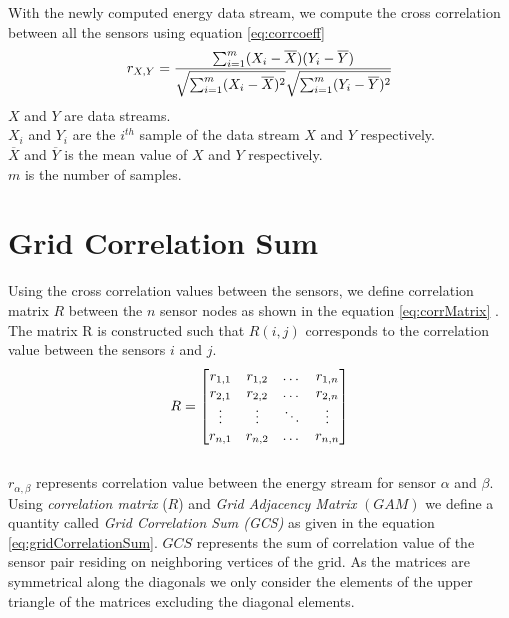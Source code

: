 With the newly computed energy data stream, we compute the cross correlation between all the sensors using equation \ref{eq:corrcoeff}
\begin{equation}
\label{eq:corrcoeff}
r_{X,Y}=\frac{\sum_{i=1}^{m}(X_i-\overline{X})(Y_i-\overline{Y})}{\sqrt{\sum_{i=1}^{m}(X_i-\overline{X})^2}\sqrt{\sum_{i=1}^{m}(Y_i-\overline{Y})^2}} \\
\end{equation}
$X$ and $Y$ are data streams.\\
$X_i$ and $Y_i$ are the $i^{th}$ sample of the data stream $X$ and $Y$ respectively.\\
$\overline{X}$ and $\overline{Y}$ is the mean value of $X$ and $Y$ respectively.\\
$m$ is the number of samples.\\

\section{Grid Correlation Sum}
\label{sec:gcs}
Using the cross correlation values between the sensors, we define correlation matrix $R$ between the $n$ sensor nodes as shown in the equation \ref{eq:corrMatrix} . The matrix R is constructed such that $R(i,j)$ corresponds to the correlation value between the sensors $i$ and $j$.
\begin{equation}
\label{eq:corrMatrix}
\centering
R = 
\begin{bmatrix}
    r_{1,1} & r_{1,2} & \dots  & r_{1,n} \\
    r_{2,1} & r_{2,2}  & \dots  & r_{2,n} \\
    \vdots & \vdots  & \ddots & \vdots \\
    r_{n,1} & r_{n,2}  & \dots  & r_{n,n}
\end{bmatrix}
\end{equation}\\
$r_{\alpha,\beta}$ represents correlation value between the energy stream for sensor $\alpha$ and $\beta$.\\


Using \textit{correlation matrix} ($R$) and \textit{Grid Adjacency Matrix} $(GAM)$ we define a quantity called \textit{Grid Correlation Sum (GCS)} as given in the equation \ref{eq:gridCorrelationSum}. $GCS$ represents the sum of correlation value of the sensor pair residing on neighboring vertices of the grid.
As the matrices are symmetrical along the diagonals we only consider the elements of the upper triangle of the matrices excluding the diagonal elements. 

